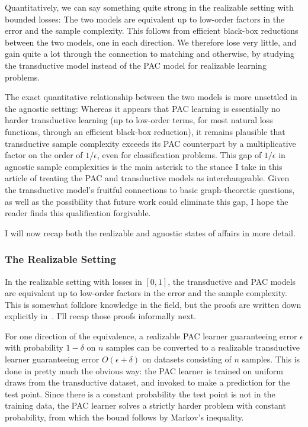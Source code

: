 Quantitatively, we can say something quite strong in the realizable setting with bounded losses: The two models are equivalent up to  low-order factors in the error and the sample complexity. This follows from  efficient black-box reductions  between the two models, one in each direction. We therefore lose very little, and gain quite a lot through the connection to matching and otherwise, by studying the transductive model instead of the PAC model for realizable learning problems.

The exact quantitative relationship between the two models  is more unsettled in the agnostic setting: Whereas it appears that PAC learning is essentially  no harder  transductive learning (up to low-order terms, for most natural loss functions, through an efficient black-box reduction), it remains plausible that transductive sample complexity exceeds its PAC counterpart by a multiplicative factor on the order of $1/\epsilon$, even for classification problems.
%
This gap of $1/\epsilon$ in agnostic sample complexities is the main asterisk to the stance I take in this article of treating the PAC and transductive models as interchangeable. Given  the transductive model's  fruitful connections to basic graph-theoretic questions, as well as the possibility that future work could eliminate this gap, I hope the reader finds this qualification forgivable.

I will now recap both the realizable and agnostic states of affairs in more detail.



\subsubsection*{The Realizable Setting}
  In the realizable setting with losses in $[0,1]$, the transductive and PAC models are equivalent up to  low-order factors in the error and the sample complexity. This is somewhat folklore knowledge in the field, but the proofs are written down explicitly in~\cite{asilis_regularization_2024}.  I'll recap those proofs informally next.

For one direction of the equivalence, a realizable PAC learner guaranteeing error $\epsilon$ with probability $1-\delta$ on $n$ samples can be converted to a realizable transductive learner guaranteeing error $O(\epsilon + \delta)$ on datasets consisting of $n$ samples. This is done in pretty much the obvious way: the PAC learner is trained on uniform draws from the transductive dataset, and invoked to make a prediction for the test point. Since there is a constant probability the test point is not in the training data, the PAC learner solves a strictly harder problem with constant probability, from which the bound follows by Markov's inequality.

